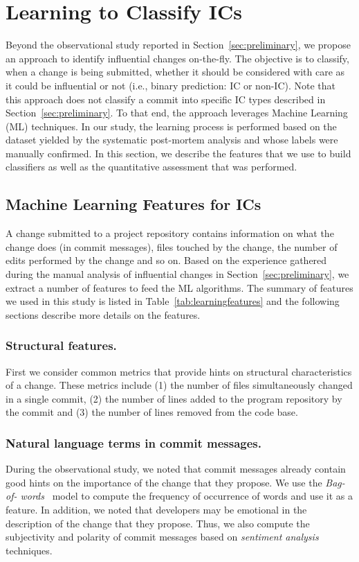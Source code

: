 \section{Learning to Classify IC{\scriptsize s}}
\label{sec:model}

Beyond the observational study reported in Section~\ref{sec:preliminary}, we
propose an approach to identify influential changes on-the-fly. The objective
is to classify, when a change is being submitted, whether it should be
considered with care as it could be influential or not (i.e., binary prediction: IC or non-IC). Note that this approach does not classify a commit into specific IC types described in Section~\ref{sec:preliminary}.
To that end, the approach
leverages Machine Learning (ML) techniques. In our study, the learning process
is performed based on the dataset yielded by the systematic post-mortem
analysis and whose labels were manually confirmed. In this section, we describe
the features that we use to build classifiers as well as the quantitative
assessment that was performed.

\subsection{Machine Learning Features for ICs}

A change submitted to a project repository contains information on what the
change does (in commit messages), files touched by the change, the number of
edits performed by the change and so on. Based on the experience gathered
during the manual analysis of influential changes in
Section~\ref{sec:preliminary}, we extract a number of features to feed the ML
algorithms. The summary of features we used in this study is listed in Table~\ref{tab:learningfeatures} and the following sections describe more details on the features.




\subsubsection{Structural features.}
First we consider common metrics that provide hints on structural
characteristics of a change.
These metrics include (1) the number of files simultaneously changed in a single
commit, (2) the number of lines added to the program repository by the 
commit and (3) the number of lines removed from the code base.


\subsubsection{Natural language terms in commit messages.} During the
observational study, we noted that commit messages already contain good hints
on the importance of the change that they propose. We use the {\it Bag-of-
words}~\cite{lewis:ecml:1998} model to compute the frequency of occurrence of
words and use it as a feature. In addition, we noted that developers may be
emotional in the description of the change that they propose. Thus, we also
compute the subjectivity and polarity of commit messages based on {\it
sentiment analysis}~\cite{hu_opinion_2006,ohana_opinion_2009,
liu_sentiment_2010,thelwall_sentiment_2010} techniques.

